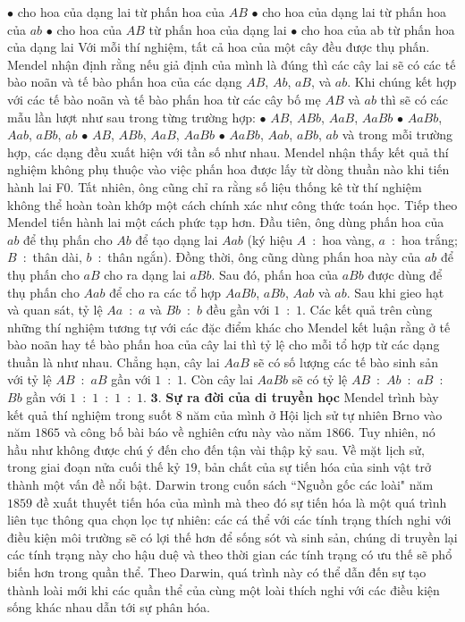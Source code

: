 \begin{multicols}{2}
	\vskip 0.1cm
	$\bullet$ cho hoa của dạng lai từ phấn hoa của $AB$
	\vskip 0.1cm
	$\bullet$ cho hoa của dạng lai từ phấn hoa của $ab$
	\vskip 0.1cm
	$\bullet$ cho hoa của $AB$ từ phấn hoa của dạng lai
	\vskip 0.1cm
	$\bullet$ cho hoa của ab từ phấn hoa của dạng lai
	\vskip 0.1cm
	Với mỗi thí nghiệm, tất cả hoa của một cây đều được thụ phấn. Mendel nhận định rằng nếu giả định của mình là đúng thì các cây lai sẽ có các tế bào noãn và tế bào phấn hoa của các dạng $AB$, $Ab$, $aB$, và $ab$. Khi chúng kết hợp với các tế bào noãn và tế bào phấn hoa từ các cây bố mẹ $AB$ và $ab$ thì sẽ có các mẫu lần lượt như sau trong từng trường hợp:
	\vskip 0.1cm
	$\bullet$ $AB$, $ABb$, $AaB$, $AaBb$
	\vskip 0.1cm
	$\bullet$ $AaBb$, $Aab$, $aBb$, $ab$
	\vskip 0.1cm
	$\bullet$ $AB$, $ABb$, $AaB$, $AaBb$
	\vskip 0.1cm
	$\bullet$ $AaBb$, $Aab$, $aBb$, $ab$
	\vskip 0.1cm
	và trong mỗi trường hợp, các dạng đều xuất hiện với tần số như nhau.
	\vskip 0.1cm
	Mendel nhận thấy kết quả thí nghiệm không phụ thuộc vào việc phấn hoa được lấy từ dòng thuần nào khi tiến hành lai F$0$. Tất nhiên, ông cũng chỉ ra rằng số liệu thống kê từ thí nghiệm không thể hoàn toàn khớp một cách chính xác như công thức toán học.
	\vskip 0.1cm
	Tiếp theo Mendel tiến hành lai một cách phức tạp hơn. Đầu tiên, ông dùng phấn hoa của $ab$ để thụ phấn cho $Ab$ để tạo dạng lai $Aab$ (ký hiệu $A$~:~hoa vàng, $a$~:~hoa trắng; $B$~:~thân dài, $b$~:~thân ngắn). Đồng thời, ông cũng dùng phấn hoa này của $ab$ để thụ phấn cho $aB$ cho ra dạng lai $aBb$. Sau đó, phấn hoa của $aBb$ được dùng để thụ phấn cho $Aab$ để cho ra các tổ hợp $AaBb$, $aBb$, $Aab$ và $ab$. Sau khi gieo hạt và quan sát, tỷ lệ $Aa$~:~$a$ và $Bb$~:~$b$ đều gần với $1$~:~$1$.
	\vskip 0.1cm
	Các kết quả trên cùng những thí nghiệm tương tự với các đặc điểm khác cho Mendel kết luận rằng ở tế bào noãn hay tế bào phấn hoa của cây lai thì tỷ lệ cho mỗi tổ hợp từ các dạng thuần là như nhau. Chẳng hạn, cây lai $AaB$ sẽ có số lượng các tế bào sinh sản với tỷ lệ $AB$~:~$aB$ gần với $1$~:~$1$. Còn cây lai $AaBb$ sẽ có tỷ lệ $AB$~:~$Ab$~:~$aB$~:~$Bb$ gần với $1$~:~$1$~:~$1$~:~$1$.
	\vskip 0.1cm
	$\pmb{3.}$ \textbf{\color{timhieukhoahoc}Sự ra đời của di truyền học}
	\vskip 0.1cm
	Mendel trình bày kết quả thí nghiệm trong suốt $8$ năm của mình ở Hội lịch sử tự nhiên Brno vào năm $1865$ và công bố bài báo về nghiên cứu này vào năm $1866$. Tuy nhiên, nó hầu như không được chú ý đến cho đến tận vài thập kỷ sau.
	\vskip 0.1cm
	Về mặt lịch sử, trong giai đoạn nửa cuối thế kỷ $19$, bản chất của sự tiến hóa của sinh vật trở thành một vấn đề nổi bật. Darwin trong cuốn sách ``Nguồn gốc các loài" năm $1859$ đề xuất thuyết tiến hóa của mình mà theo đó sự tiến hóa là một quá trình liên tục thông qua chọn lọc tự nhiên: các cá thể với các tính trạng thích nghi với điều kiện môi trường sẽ có lợi thế hơn để sống sót và sinh sản, chúng di truyền lại các tính trạng này cho hậu duệ và theo thời gian các tính trạng có ưu thế sẽ phổ biến hơn trong quần thể. Theo Darwin, quá trình này có thể dẫn đến sự tạo thành loài mới khi các quần thể của cùng một loài thích nghi với các điều kiện sống khác nhau dẫn tới sự phân hóa.

\end{multicols}
